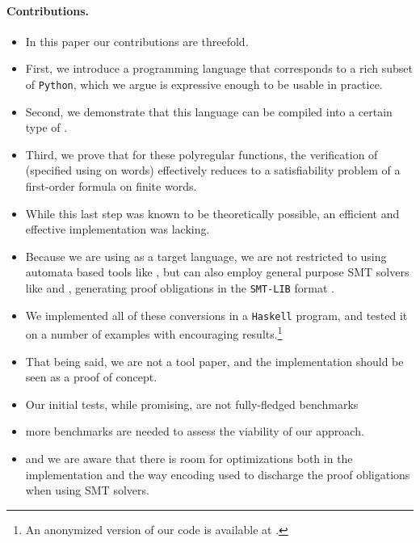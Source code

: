 \paragraph{Contributions.} 
\begin{itemize}
  \item In this paper our contributions are threefold.
  \item 
First, we introduce a programming language that corresponds to a rich subset of
\texttt{Python}, which we argue is expressive enough to be usable in practice.

\item Second, we demonstrate that this language can be compiled into a certain type
of . 

\item Third, we prove that for these polyregular
functions, the verification of  (specified using
 on words) effectively reduces to a satisfiability
problem of a first-order formula on finite words. 

\item While this last step was
known to be theoretically possible, an efficient and effective implementation
was lacking. 

\item Because we are using  as a target language,
we are not restricted to using automata based tools like 
\cite{MONA01}, but can also employ general purpose SMT solvers like 
\cite{z3} and  \cite{cvc5}, generating proof
obligations in the \texttt{SMT-LIB} format \cite{BARRETT17}.

\item We implemented all of these conversions in a \texttt{Haskell} program, and
tested it on a number of examples with encouraging results.\footnote{An
anonymized version of our code is available at \repositoryUrl.}

\item That being said, we are not a tool paper, and the implementation should
  be seen as a proof of concept.

\item Our initial tests, while promising, are not fully-fledged benchmarks

\item more benchmarks are needed to assess the viability of our approach.

\item and we are aware that there is room for 
optimizations both in the implementation and the way encoding used
to discharge the proof obligations when using SMT solvers.

\end{itemize}

